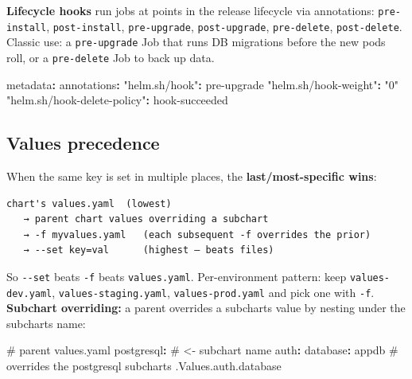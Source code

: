 \documentclass[11pt]{article}
\newenvironment{Shaded}{\begin{snugshade}}{\end{snugshade}}
\newcommand{\AttributeTok}[1]{\textcolor[rgb]{0.16,0.50,0.73}{#1}}
\newcommand{\CommentTok}[1]{\textcolor[rgb]{0.48,0.49,0.49}{#1}}
\newcommand{\FunctionTok}[1]{\textcolor[rgb]{0.56,0.27,0.68}{#1}}
\newcommand{\KeywordTok}[1]{\textcolor[rgb]{0.81,0.81,0.76}{\textbf{#1}}}
\newcommand{\StringTok}[1]{\textcolor[rgb]{0.96,0.31,0.31}{#1}}
\begin{document}
\textbf{Lifecycle hooks} run jobs at points in the release lifecycle via annotations: \texttt{pre-install}, \texttt{post-install}, \texttt{pre-upgrade}, \texttt{post-upgrade}, \texttt{pre-delete}, \texttt{post-delete}. Classic use: a \texttt{pre-upgrade} Job that runs DB migrations before the new pods roll, or a \texttt{pre-delete} Job to back up data.


\begin{Shaded}
\begin{Highlighting}[]
\FunctionTok{metadata}\KeywordTok{:}
\AttributeTok{  }\FunctionTok{annotations}\KeywordTok{:}
\AttributeTok{    }\FunctionTok{"helm.sh/hook"}\KeywordTok{:}\AttributeTok{ pre{-}upgrade}
\AttributeTok{    }\FunctionTok{"helm.sh/hook{-}weight"}\KeywordTok{:}\AttributeTok{ }\StringTok{"0"}
\AttributeTok{    }\FunctionTok{"helm.sh/hook{-}delete{-}policy"}\KeywordTok{:}\AttributeTok{ hook{-}succeeded}
\end{Highlighting}
\end{Shaded}

\subsection{Values precedence}\label{values-precedence}

When the same key is set in multiple places, the \textbf{last/most-specific wins}:

\setcodelang{}

\begin{verbatim}
chart's values.yaml  (lowest)
   → parent chart values overriding a subchart
   → -f myvalues.yaml   (each subsequent -f overrides the prior)
   → --set key=val      (highest — beats files)
\end{verbatim}

So \texttt{-\/-set} beats \texttt{-f} beats \texttt{values.yaml}. Per-environment pattern: keep \texttt{values-dev.yaml}, \texttt{values-staging.yaml}, \texttt{values-prod.yaml} and pick one with \texttt{-f}. \textbf{Subchart overriding:} a parent overrides a subchart\textquotesingle s value by nesting under the subchart\textquotesingle s name:


\begin{Shaded}
\begin{Highlighting}[]
\CommentTok{\# parent values.yaml}
\FunctionTok{postgresql}\KeywordTok{:}\CommentTok{           \# \textless{}{-} subchart name}
\AttributeTok{  }\FunctionTok{auth}\KeywordTok{:}
\AttributeTok{    }\FunctionTok{database}\KeywordTok{:}\AttributeTok{ appdb}\CommentTok{   \# overrides the postgresql subchart\textquotesingle{}s .Values.auth.database}
\end{Highlighting}
\end{Shaded}
\end{document}

